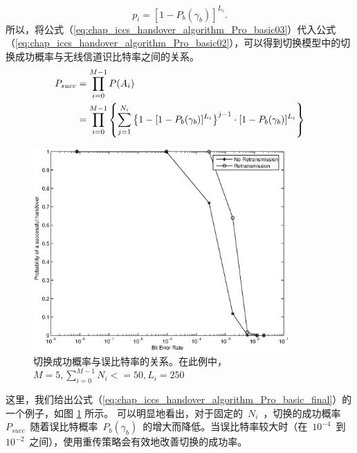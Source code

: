 \begin{equation}\label{eq:chap_iccs_handover_algorithm_Pro_basic03}
p_{i}=[1-P_{b}(\gamma_{b})]^{L_{i}}.
\end{equation}
所以，将公式（\ref{eq:chap_iccs_handover_algorithm_Pro_basic03}）代入公式（\ref{eq:chap_iccs_handover_algorithm_Pro_basic02}），可以得到切换模型中的切换成功概率与无线信道识比特率之间的关系。
\begin{align}
\label{eq:chap_iccs_handover_algorithm_Pro_basic_final}
\notag P_{succ}&=\prod_{i=0}^{M-1}P(A_{i})\\
&=\prod_{i=0}^{M-1}\left\{ \sum_{j=1}^{N_{i}}\left\{ 1-[1-P_{b}(\gamma_{b})]^{L_{i}}\right\} ^{j-1} \cdot[1-P_{b}(\gamma_{b})]^{L_{i}}\right\}
\end{align}
\begin{figure}[t]
\begin{centering}
\includegraphics[height=7.75cm]{iccs_ber_prob}
\par\end{centering}
\caption{切换成功概率与误比特率的关系。在此例中，~$M=5,\sum_{i=0}^{M-1}N_i<=50,L_i=250$~}
\label{fig:chap_iccs_handover_algorithm_PBER}
\end{figure}
这里，我们给出公式（\ref{eq:chap_iccs_handover_algorithm_Pro_basic_final}）的一个例子，如图 \ref{fig:chap_iccs_handover_algorithm_PBER} 所示。
可以明显地看出，对于固定的~$N_i$~，切换的成功概率~$P_{succ}$~随着误比特概率~$P_b(\gamma_b)$~的增大而降低。当误比特率较大时（在~$10^{-4}$~到~$10^{-2}$~之间），使用重传策略会有效地改善切换的成功率。

